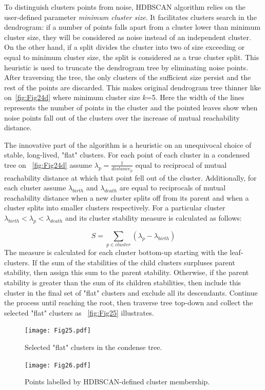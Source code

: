 To distinguish clusters points from noise, HDBSCAN algorithm relies on the user-defined parameter \textit{minimum cluster size}. It facilitates clusters search in the dendrogram: if a number of points falls apart from a cluster lower than minimum cluster size, they will be considered as noise instead of an independent cluster. On the other hand, if a split divides the cluster into two of size exceeding or equal to minimum cluster size, the split is considered as a true cluster split. This heuristic is used to truncate the dendrogram tree by eliminating noise points. After traversing the tree, the only clusters of the sufficient size persist and the rest of the points are discarded. This makes original dendrogram tree thinner like on~\autoref{fig:Fig24d} where minimum cluster size $k$=5. Here the width of the lines represents the number of points in the cluster and the pointed leaves show when noise points fall out of the clusters over the increase of mutual reachability distance.

The innovative part of the algorithm is a heuristic on an unequivocal choice of stable, long-lived, "flat" clusters. For each point of each cluster in a condensed tree on ~\autoref{fig:Fig24d} assume $\lambda_p=\frac{1}{distance_p}$ equal to reciprocal of mutual reachability distance at which that point fell out of the cluster. Additionally, for each cluster assume $\lambda_{birth}$ and $\lambda_{death}$ are equal to reciprocals of mutual reachability distance when a new cluster splits off from its parent and when a cluster splits into smaller clusters respectively. For a particular cluster $\lambda_{birth}< \lambda_p <\lambda_{death}$ and its cluster stability measure is calculated as follows:

\begin{equation}
  S = \sum_{p\in cluster}(\lambda_p - \lambda_{birth})
  \label{eq:equat17}
\end{equation}
The measure is calculated for each cluster bottom-up starting with the leaf-clusters. If the sum of the stabilities of the child clusters surpluses parent stability, then assign this sum to the parent stability. Otherwise, if the parent stability is greater than the sum of its children stabilities, then include this cluster in the final set of "flat" clusters and exclude all its descendants. Continue the process until reaching the root, then traverse tree top-down and collect the selected "flat" clusters as ~\autoref{fig:Fig25} illustrates.
\begin{figure}[!hp]
    \centering
    \begin{minipage}{0.42\textwidth}
        \centering
        \texttt{[image: Fig25.pdf]}
        \caption{Selected "flat" clusters in the condense tree.}
        \label{fig:Fig25}
    \end{minipage}\hfill
    \begin{minipage}{0.42\textwidth}
        \centering
        \texttt{[image: Fig26.pdf]} 
        \caption{Points labelled by HDBSCAN-defined cluster membership.}
        \label{fig:Fig26}
    \end{minipage}
\end{figure}

